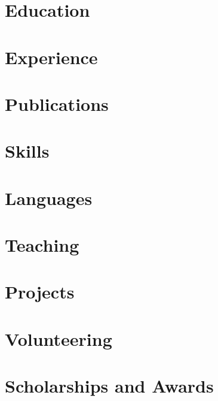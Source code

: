 \documentclass[letterpaper,11pt]{article}
\begin{document}


\section{Education}


\section{Experience}


\section{Publications}


\begin{minipage}[t]{0.495\textwidth}
\section{Skills}

\end{minipage}
\begin{minipage}[t]{0.495\textwidth}
\section{Languages}

\end{minipage}

\begin{longversion}
\pagebreak
\end{longversion}

\section{Teaching}


\section{Projects}


\section{Volunteering}


\section{Scholarships and Awards}

\end{document}
